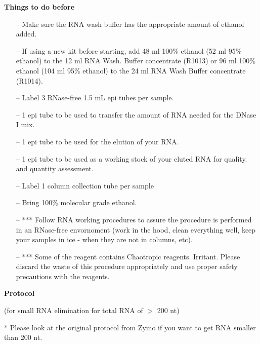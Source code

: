 \documentclass[11pt, oneside]{article}
\begin{document}
		\vspace{3mm}
		
		{\bf Things to do before}
			
		\begin{itemize}
			\item[--] Make sure the RNA wash buffer has the appropriate amount of ethanol added.
			\item[--] If using a new kit before starting, add 48 ml 100\% ethanol (52 ml 95\% ethanol) to the 12 ml RNA Wash. Buffer concentrate (R1013) 			or 96 ml 100\% ethanol (104 ml 95\% ethanol) to the 24 ml RNA Wash Buffer concentrate (R1014).
			\item[--] Label 3 RNase-free 1.5 mL epi tubes per sample.
			\item[--]  1 epi tube to be used to transfer the amount of RNA needed for the DNase I mix.
			\item[--] 1 epi tube to be used for the elution of your RNA.
			\item[--] 1 epi tube to be used as a working stock of your eluted RNA for quality. and quantity assessment.
			\item[--] Label 1 column collection tube per sample
			\item[--] Bring 100\% molecular grade ethanol.
			\item[--] *** Follow RNA working procedures to assure the procedure is performed in an RNase-free envornoment (work in the hood, clean 			everything well, keep your samples in ice - when they are not in columns, etc).
			\item[--] *** Some of the reagent contains Chaotropic reagents. Irritant. Please discard the waste of this procedure appropriately and use 				proper safety precautions with the reagents. 
		\end{itemize}
		
		\vspace{3mm}
		
		{\bf Protocol}
		
		\noindent (for small RNA elimination for total RNA of $>$ 200 nt)
	
		\vspace{3mm}
		
		\noindent ** Please look at the original protocol from Zymo if you want to get RNA smaller than 200 nt.
		
\end{document}

